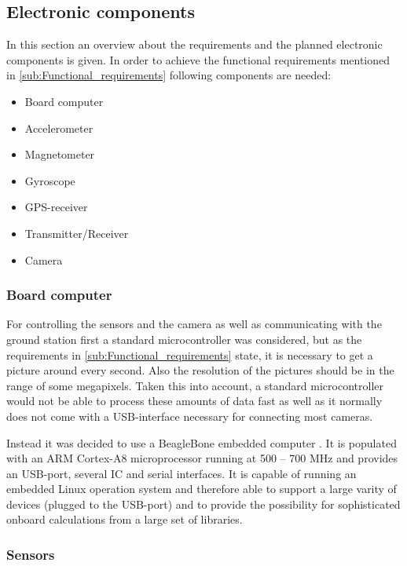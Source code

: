 \documentclass[fontsize=11pt,paper=a4,]{scrartcl}
\begin{document}
\subsection{Electronic components}
In this section an overview about the requirements and the planned electronic components is given. In order to achieve the functional requirements mentioned in \ref{sub:Functional_requirements} following components are needed:

\begin{itemize}
 \item Board computer
 \item Accelerometer
 \item Magnetometer
 \item Gyroscope
 \item GPS-receiver
 \item Transmitter/Receiver
 \item Camera
\end{itemize}


\subsubsection*{Board computer}

For controlling the sensors and the camera as well as communicating with the ground station first a standard microcontroller was considered, but as the requirements in \ref{sub:Functional_requirements} state, it is necessary to get a picture around every second. Also the resolution of the pictures should be in the range of some megapixels. Taken this into account, a standard microcontroller would not be able to process these amounts of data fast as well as it normally does not come with a USB-interface necessary for connecting most cameras.

Instead it was decided to use a BeagleBone embedded computer \cite{BeagleBone:SRM}. It is populated with an ARM Cortex-A8 microprocessor running at 500 -- 700 MHz and provides an USB-port, several I{\texttwosuperior}C and serial interfaces. It is capable of running an embedded Linux operation system and therefore able to support a large varity of devices (plugged to the USB-port) and to provide the possibility for sophisticated onboard calculations from a large set of libraries.

\subsubsection*{Sensors}
\end{document}
